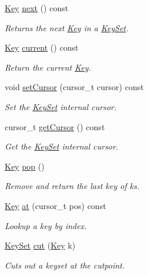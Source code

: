 \begin{DoxyCompactItemize}
\hyperlink{classkdb_1_1Key}{Key} \hyperlink{classkdb_1_1KeySet_affd52d130faf184361297f9e7f0c9f16}{next} () const
\begin{DoxyCompactList}\small\item\em Returns the next \hyperlink{classkdb_1_1Key}{Key} in a \hyperlink{classkdb_1_1KeySet}{Key\+Set}. \end{DoxyCompactList}\item 
\hyperlink{classkdb_1_1Key}{Key} \hyperlink{classkdb_1_1KeySet_a0a0fc4efecd6dcbfde5fc35301b60349}{current} () const
\begin{DoxyCompactList}\small\item\em Return the current \hyperlink{classkdb_1_1Key}{Key}. \end{DoxyCompactList}\item 
void \hyperlink{classkdb_1_1KeySet_a716d522e1f64e53d4f9706b5d71bb1b5}{set\+Cursor} (cursor\+\_\+t cursor) const
\begin{DoxyCompactList}\small\item\em Set the \hyperlink{classkdb_1_1KeySet}{Key\+Set} internal cursor. \end{DoxyCompactList}\item 
cursor\+\_\+t \hyperlink{classkdb_1_1KeySet_a6f93621c0baab89dfa122391e3117f34}{get\+Cursor} () const
\begin{DoxyCompactList}\small\item\em Get the \hyperlink{classkdb_1_1KeySet}{Key\+Set} internal cursor. \end{DoxyCompactList}\item 
\hyperlink{classkdb_1_1Key}{Key} \hyperlink{classkdb_1_1KeySet_a7f207457a1c12633a1a5301a3a1bbaed}{pop} ()
\begin{DoxyCompactList}\small\item\em Remove and return the last key of {\ttfamily ks}. \end{DoxyCompactList}\item 
\hyperlink{classkdb_1_1Key}{Key} \hyperlink{classkdb_1_1KeySet_ab2821dd5568636f5e789e49562c7da21}{at} (cursor\+\_\+t pos) const
\begin{DoxyCompactList}\small\item\em Lookup a key by index. \end{DoxyCompactList}\item 
\hyperlink{classkdb_1_1KeySet}{Key\+Set} \hyperlink{classkdb_1_1KeySet_ab283da798a7670d5c3f0e1a5b821e666}{cut} (\hyperlink{classkdb_1_1Key}{Key} k)
\begin{DoxyCompactList}\small\item\em Cuts out a keyset at the cutpoint. \end{DoxyCompactList}\item 

\end{DoxyCompactItemize}
